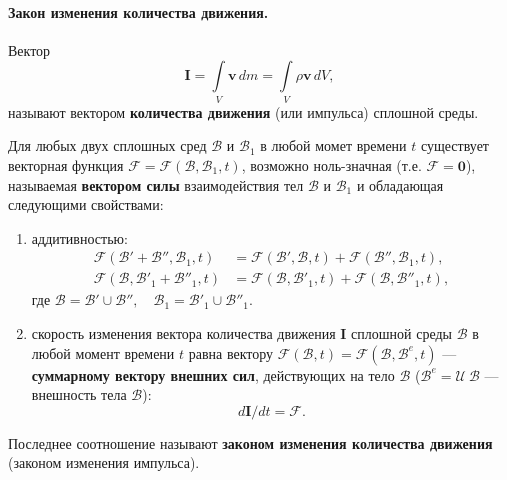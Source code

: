 
\paragraph{Закон изменения количества движения.} 
\begin{definition*}
	Вектор 
	\begin{equation*}
		\mathbf{I} = \int\limits_{V} \mathbf{v} \, dm = \int\limits_{V} \rho \mathbf{v} \, dV,
	\end{equation*}
	называют вектором \textbf{количества движения} (или импульса) сплошной среды.
\end{definition*}

\begin{axiom}
	Для любых двух сплошных сред $\mathcal{B}$ и $\mathcal{B}_1$ в любой момет времени $t$ существует векторная функция $\mathcal{F} = \mathcal{F}(\mathcal{B}, \mathcal{B}_1, t)$, возможно ноль-значная (т.е. $\mathcal{F} = \mathbf{0}$), называемая \textbf{вектором силы} взаимодействия тел $\mathcal{B}$ и $\mathcal{B}_1$ и обладающая следующими свойствами:
	\begin{enumerate}
		\item аддитивностью:
		\begin{align*}
			\mathcal{F}(\mathcal{B}' + \mathcal{B}'', \mathcal{B}_1, t) &= \mathcal{F}(\mathcal{B}', \mathcal{B}, t) + \mathcal{F}(\mathcal{B}'', \mathcal{B}_1, t), \\
			\mathcal{F}(\mathcal{B}, \mathcal{B}'_1 + \mathcal{B}''_1, t) &= \mathcal{F}(\mathcal{B}, \mathcal{B}'_1, t) + \mathcal{F}(\mathcal{B}, \mathcal{B}''_1, t),
		\end{align*}
		где $\mathcal{B} = \mathcal{B}' \cup \mathcal{B}'', \quad \mathcal{B}_1 = \mathcal{B}'_1 \cup \mathcal{B}''_1$.
		
		\item скорость изменения вектора количества движения $\mathbf{I}$ сплошной среды $\mathcal{B}$ в любой момент времени $t$ равна вектору $\mathcal{F}(\mathcal{B}, t) = \mathcal{F}(\mathcal{B}, \mathcal{B}^{e}, t)$ --- \textbf{суммарному вектору внешних сил}, действующих на тело $\mathcal{B}$ ($\mathcal{B}^{e} = \mathcal{U} \ \mathcal{B}$ --- внешность тела $\mathcal{B}$):
		\begin{equation*}
			d\mathbf{I} / dt = \mathcal{F}.
		\end{equation*}
	\end{enumerate}
	
	Последнее соотношение называют \textbf{законом изменения количества движения} (законом изменения импульса).
\end{axiom}

